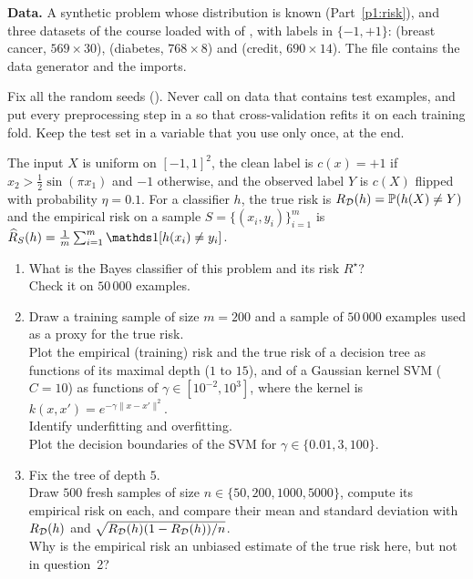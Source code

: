 \documentclass[a4paper,11pt]{article}
\begin{document}
\medskip
\noindent\textbf{Data.} A synthetic problem whose distribution is known (Part~\ref{p1:risk}), and three datasets of the
course loaded with  of , with labels in $\{-1,+1\}$:  (breast cancer,
$569\times30$),  (diabetes, $768\times8$) and  (credit, $690\times14$). The file
 contains the data generator and the imports.

\begin{tip}
Fix all the random seeds (). Never call  on data that contains test examples, and
put every preprocessing step in a  so that cross-validation refits it on each training fold. Keep the
test set in a variable that you use only once, at the end.
\end{tip}

\label{p1:risk}

The input $X$ is uniform on $[-1,1]^2$, the clean label is $c(x)=+1$ if $x_2>\frac12\sin(\pi x_1)$ and $-1$ otherwise,
and the observed label $Y$ is $c(X)$ flipped with probability $\eta=0.1$. For a classifier $h$, the true risk is
$R_{\mathcal{D}}(h)=\mathbb{P}(h(X)\neq Y)$ and the empirical risk on a sample $S=\{(x_i,y_i)\}_{i=1}^m$ is
$\RS(h)=\frac1m\sum_{i=1}^m\ind{h(x_i)\neq y_i}$.

\begin{enumerate}
\item What is the Bayes classifier of this problem and its risk $R^\star$?\\
      Check it on $50\,000$ examples.
\item Draw a training sample of size $m=200$ and a sample of $50\,000$ examples used as a proxy for the true risk.\\
      Plot the empirical (training) risk and the true risk of a decision tree as functions of its maximal depth
      ($1$ to $15$), and of a Gaussian kernel SVM ($C=10$) as functions of $\gamma\in[10^{-2},10^{3}]$, where the kernel
      is $k(x,x')=e^{-\gamma\|x-x'\|^2}$.\\
      Identify underfitting and overfitting.\\
      Plot the decision boundaries of the
      SVM for $\gamma\in\{0.01,3,100\}$.
\item Fix the tree of depth $5$.\\
      Draw $500$ fresh samples of size $n\in\{50,200,1000,5000\}$, compute its empirical
      risk on each, and compare their mean and standard deviation with $R_{\mathcal{D}}(h)$ and $\sqrt{R_{\mathcal{D}}(h)(1-R_{\mathcal{D}}(h))/n}$.\\
      Why is the empirical risk an unbiased estimate of the true risk here, but not in question~2?
\end{enumerate}
\end{document}
